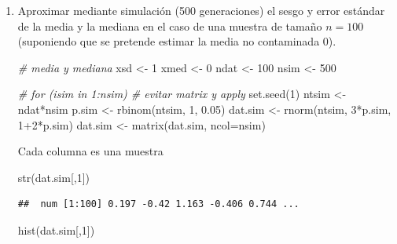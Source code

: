 \documentclass[
]{book}
\newenvironment{Shaded}{\begin{snugshade}}{\end{snugshade}}
\newcommand{\AttributeTok}[1]{\textcolor[rgb]{0.77,0.63,0.00}{#1}}
\newcommand{\CommentTok}[1]{\textcolor[rgb]{0.56,0.35,0.01}{\textit{#1}}}
\newcommand{\DecValTok}[1]{\textcolor[rgb]{0.00,0.00,0.81}{#1}}
\newcommand{\FloatTok}[1]{\textcolor[rgb]{0.00,0.00,0.81}{#1}}
\newcommand{\FunctionTok}[1]{\textcolor[rgb]{0.00,0.00,0.00}{#1}}
\newcommand{\NormalTok}[1]{#1}
\newcommand{\OtherTok}[1]{\textcolor[rgb]{0.56,0.35,0.01}{#1}}
\newcommand{\SpecialCharTok}[1]{\textcolor[rgb]{0.00,0.00,0.00}{#1}}
\theoremstyle{break}
\theoremstyle{definition}
\theoremstyle{definition}
\theoremstyle{definition}
\theoremstyle{definition}
\theoremstyle{remark}
\begin{document}
\vspace{0.5cm}

\begin{enumerate}
\def\labelenumi{\alph{enumi})}
\item
  Aproximar mediante simulación (500 generaciones) el sesgo y
  error estándar de la media y la mediana en el caso de una
  muestra de tamaño \(n=100\) (suponiendo que se pretende estimar la
  media no contaminada 0).

\begin{Shaded}
\begin{Highlighting}[]
\CommentTok{\# media y mediana}
\NormalTok{xsd }\OtherTok{\textless{}{-}} \DecValTok{1}
\NormalTok{xmed }\OtherTok{\textless{}{-}} \DecValTok{0}
\NormalTok{ndat }\OtherTok{\textless{}{-}} \DecValTok{100}
\NormalTok{nsim }\OtherTok{\textless{}{-}} \DecValTok{500}

\CommentTok{\# for (isim in 1:nsim) \# evitar matrix y apply}
\FunctionTok{set.seed}\NormalTok{(}\DecValTok{1}\NormalTok{)}
\NormalTok{ntsim }\OtherTok{\textless{}{-}}\NormalTok{ ndat}\SpecialCharTok{*}\NormalTok{nsim}
\NormalTok{p.sim }\OtherTok{\textless{}{-}} \FunctionTok{rbinom}\NormalTok{(ntsim, }\DecValTok{1}\NormalTok{, }\FloatTok{0.05}\NormalTok{)}
\NormalTok{dat.sim }\OtherTok{\textless{}{-}} \FunctionTok{rnorm}\NormalTok{(ntsim, }\DecValTok{3}\SpecialCharTok{*}\NormalTok{p.sim, }\DecValTok{1}\SpecialCharTok{+}\DecValTok{2}\SpecialCharTok{*}\NormalTok{p.sim)}
\NormalTok{dat.sim }\OtherTok{\textless{}{-}} \FunctionTok{matrix}\NormalTok{(dat.sim, }\AttributeTok{ncol=}\NormalTok{nsim)}
\end{Highlighting}
\end{Shaded}

  Cada columna es una muestra

\begin{Shaded}
\begin{Highlighting}[]
\FunctionTok{str}\NormalTok{(dat.sim[,}\DecValTok{1}\NormalTok{])}
\end{Highlighting}
\end{Shaded}

\begin{verbatim}
##  num [1:100] 0.197 -0.42 1.163 -0.406 0.744 ...
\end{verbatim}

\begin{Shaded}
\begin{Highlighting}[]
\FunctionTok{hist}\NormalTok{(dat.sim[,}\DecValTok{1}\NormalTok{])}
\end{Highlighting}
\end{Shaded}


\end{enumerate}
\end{document}

